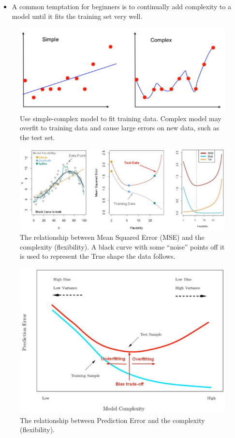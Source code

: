 \documentclass{article}
\begin{document}
\begin{itemize}
	\item A common temptation for beginners is to continually add complexity to a model until it fits the training set very well.
\end{itemize}

\begin{figure}[H]
\centering
\includegraphics[width=0.9\linewidth]{pic/simple-complex-model.png}
\caption{Use simple-complex model to fit training data. Complex model may overfit to training data and cause large errors on new data, such as the test set.}
\end{figure}

\begin{figure}[H]
\centering
\includegraphics[width=\linewidth]{pic/MSE-complexity-relationship.png}
\caption{The relationship between Mean Squared Error (MSE) and the complexity (flexibility). A black curve with some ``noise'' points off it is used to represent the True shape the data follows.}
\end{figure}

\begin{figure}[H]
\centering
\includegraphics[width=0.8\linewidth]{pic/prediction_error-complexity-relationship.png}
\caption{The relationship between Prediction Error and the complexity (flexibility).}
\end{figure}
\end{document}
